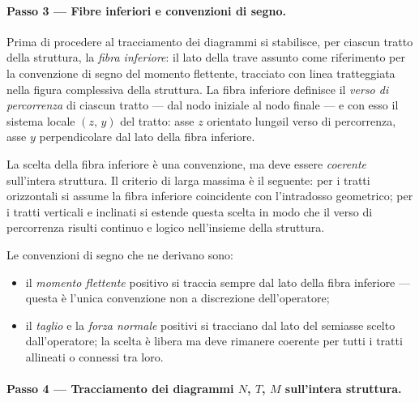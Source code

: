 \paragraph{Passo 3 --- Fibre inferiori e
	convenzioni di segno.}

Prima di procedere al tracciamento dei diagrammi
si stabilisce, per ciascun tratto della struttura,
la \emph{fibra inferiore}: il lato della trave
assunto come riferimento per la convenzione di
segno del momento flettente, tracciato con linea
tratteggiata nella figura complessiva della
struttura. La fibra inferiore definisce il
\emph{verso di percorrenza} di ciascun tratto
--- dal nodo iniziale al nodo finale --- e con
esso il sistema locale $(z,\,y)$ del tratto:
asse $z$ orientato lung\o il verso di percorrenza,
asse $y$ perpendicolare dal lato della fibra
inferiore.

La scelta della fibra inferiore è una convenzione,
ma deve essere \emph{coerente} sull'intera struttura.
Il criterio di larga massima è il seguente: per i
tratti orizzontali si assume la fibra inferiore
coincidente con l'intradosso geometrico; per i
tratti verticali e inclinati si estende questa
scelta in modo che il verso di percorrenza risulti
continuo e logico nell'insieme della struttura.

Le convenzioni di segno che ne derivano sono:
\begin{itemize}
	\item il \emph{momento flettente} positivo
	si traccia sempre dal lato della fibra
	inferiore --- questa è l'unica convenzione
	non a discrezione dell'operatore;
	\item il \emph{taglio} e la \emph{forza
		normale} positivi si tracciano dal lato
	del semiasse scelto dall'operatore; la
	scelta è libera ma deve rimanere coerente
	per tutti i tratti allineati o connessi
	tra loro.
\end{itemize}

\paragraph{Passo 4 --- Tracciamento dei diagrammi
	$N$, $T$, $M$ sull'intera struttura.}

